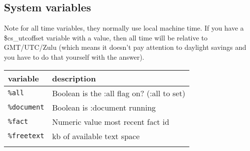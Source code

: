 \documentclass[]{article}
\begin{document}
\subsection{System variables}\label{system-variables-1}

Note for all time variables, they normally use local machine time. If
you have a \$cs\_utcoffset variable with a value, then all time will be
relative to GMT/UTC/Zulu (which means it doesn't pay attention to
daylight savings and you have to do that yourself with the answer).

\begin{longtable}[]{@{}ll@{}}
\toprule
\begin{minipage}[b]{0.12\columnwidth}\raggedright\strut
variable\strut
\end{minipage} & \begin{minipage}[b]{0.10\columnwidth}\raggedright\strut
description\strut
\end{minipage}\tabularnewline
\midrule
\endhead
\begin{minipage}[t]{0.12\columnwidth}\raggedright\strut
\texttt{\%all}\strut
\end{minipage} & \begin{minipage}[t]{0.10\columnwidth}\raggedright\strut
Boolean is the :all flag on? (:all to set)\strut
\end{minipage}\tabularnewline
\begin{minipage}[t]{0.12\columnwidth}\raggedright\strut
\texttt{\%document}\strut
\end{minipage} & \begin{minipage}[t]{0.10\columnwidth}\raggedright\strut
Boolean is :document running\strut
\end{minipage}\tabularnewline
\begin{minipage}[t]{0.12\columnwidth}\raggedright\strut
\texttt{\%fact}\strut
\end{minipage} & \begin{minipage}[t]{0.10\columnwidth}\raggedright\strut
Numeric value most recent fact id\strut
\end{minipage}\tabularnewline
\begin{minipage}[t]{0.12\columnwidth}\raggedright\strut
\texttt{\%freetext}\strut
\end{minipage} & \begin{minipage}[t]{0.10\columnwidth}\raggedright\strut
kb of available text space\strut
\end{minipage}\tabularnewline
\begin{minipage}[t]{0.12\columnwidth}\raggedright\strut

\end{minipage}
\end{longtable}
\end{document}
